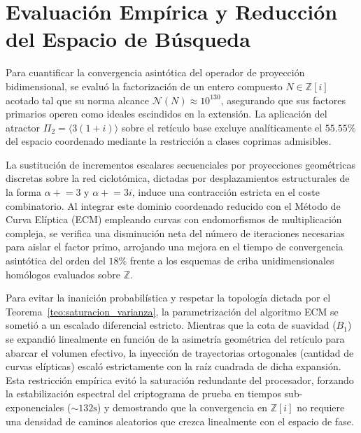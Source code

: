 \documentclass{article}
\numberwithin{equation}{section}
\theoremstyle{plain}
\theoremstyle{definition}
\begin{document}
\section{Evaluación Empírica y Reducción del Espacio de Búsqueda}
\label{sec:resultados}

Para cuantificar la convergencia asintótica del operador de proyección bidimensional, se evaluó la factorización de un entero compuesto $N \in \mathbb{Z}[i]$ acotado tal que su norma alcance $\mathcal{N}(N) \approx 10^{130}$, asegurando que sus factores primarios operen como ideales escindidos en la extensión. La aplicación del atractor $\Pi_2 = \langle 3(1+i) \rangle$ sobre el retículo base excluye analíticamente el $55.55\%$ del espacio coordenado mediante la restricción a clases coprimas admisibles.

La sustitución de incrementos escalares secuenciales por proyecciones geométricas discretas sobre la red ciclotómica, dictadas por desplazamientos estructurales de la forma $\alpha \mathrel{+}= 3$ y $\alpha \mathrel{+}= 3i$, induce una contracción estricta en el coste combinatorio. Al integrar este dominio coordenado reducido con el Método de Curva Elíptica (ECM) empleando curvas con endomorfismos de multiplicación compleja, se verifica una disminución neta del número de iteraciones necesarias para aislar el factor primo, arrojando una mejora en el tiempo de convergencia asintótica del orden del $18\%$ frente a los esquemas de criba unidimensionales homólogos evaluados sobre $\mathbb{Z}$.

Para evitar la inanición probabilística y respetar la topología dictada por el Teorema~\ref{teo:saturacion_varianza}, la parametrización del algoritmo ECM se sometió a un escalado diferencial estricto. Mientras que la cota de suavidad ($B_1$) se expandió linealmente en función de la asimetría geométrica del retículo para abarcar el volumen efectivo, la inyección de trayectorias ortogonales (cantidad de curvas elípticas) escaló estrictamente con la raíz cuadrada de dicha expansión. Esta restricción empírica evitó la saturación redundante del procesador, forzando la estabilización espectral del criptograma de prueba en tiempos sub-exponenciales ($\sim 132\text{s}$) y demostrando que la convergencia en $\mathbb{Z}[i]$ no requiere una densidad de caminos aleatorios que crezca linealmente con el espacio de fase.
\end{document}
